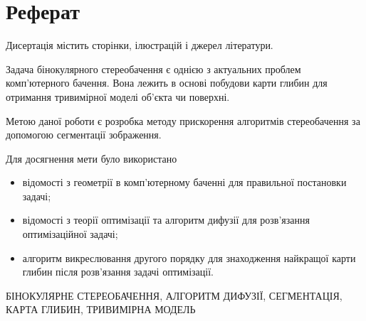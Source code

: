 \chapter*{Реферат}

Дисертація містить \pageref{LastPage} сторінки,
 ілюстрацій і
 джерел літератури.

Задача бінокулярного стереобачення є
однією з актуальних проблем комп'ютерного бачення.
Вона лежить в основі побудови карти глибин
для отримання тривимірної моделі об'єкта чи поверхні.

Метою даної роботи є розробка методу прискорення алгоритмів стереобачення
за допомогою сегментації зображення.

Для досягнення мети було використано
\begin{itemize}
  \item відомості з геометрії в комп'ютерному баченні
        для правильної постановки задачі;
  \item відомості з теорії оптимізації та
        алгоритм дифузії для розв'язання оптимізаційної задачі;
  \item алгоритм викреслювання другого порядку для знаходження
        найкращої карти глибин після розв'язання задачі оптимізації.
\end{itemize}

\MakeUppercase{бінокулярне стереобачення,
               алгоритм дифузії,
               сегментація,
               карта глибин,
               тривимірна модель}
